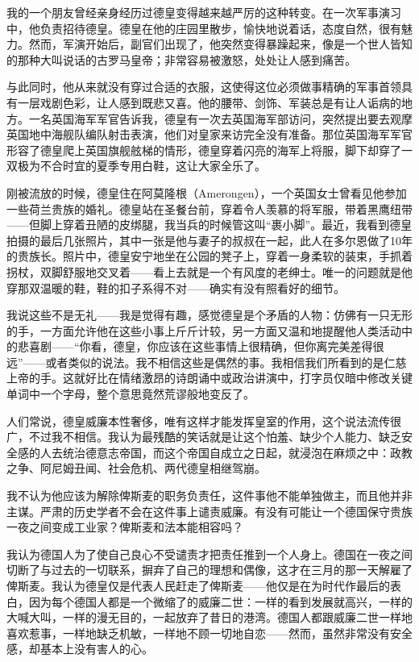 \documentclass[UTF8]{ctexart}
\begin{document}
我的一个朋友曾经亲身经历过德皇变得越来越严厉的这种转变。在一次军事演习中，他负责招待德皇。德皇在他的庄园里散步，愉快地说着话，态度自然，很有魅力。然而，军演开始后，副官们出现了，他突然变得暴躁起来，像是一个世人皆知的那种大叫说话的古罗马皇帝；非常容易被激怒，处处让人感到痛苦。

与此同时，他从来就没有穿过合适的衣服，这使得这位必须做事精确的军事首领具有一层戏剧色彩，让人感到既悲又喜。他的腰带、剑饰、军装总是有让人诟病的地方。一名英国海军军官告诉我，德皇有一次去英国海军部访问，突然提出要去观摩英国地中海舰队编队射击表演，他们对皇家来访完全没有准备。那位英国海军军官形容了德皇爬上英国旗舰舷梯的情形，德皇穿着闪亮的海军上将服，脚下却穿了一双极为不合时宜的夏季专用白鞋，这让大家全乐了。

刚被流放的时候，德皇住在阿莫隆根（Amerongen），一个英国女士曾看见他参加一些荷兰贵族的婚礼。德皇站在圣餐台前，穿着令人羡慕的将军服，带着黑鹰纽带——但脚上穿着丑陋的皮绑腿，我当兵的时候管这叫“裹小脚”。最近，我看到德皇拍摄的最后几张照片，其中一张是他与妻子的叔叔在一起，此人在多尔恩做了10年的贵族长。照片中，德皇安宁地坐在公园的凳子上，穿着一身柔软的装束，手抓着拐杖，双脚舒服地交叉着——看上去就是一个有风度的老绅士。唯一的问题就是他穿那双温暖的鞋，鞋的扣子系得不对——确实有没有照看好的细节。

我说这些不是无礼——我是觉得有趣，感觉德皇是个矛盾的人物：仿佛有一只无形的手，一方面允许他在这些小事上斤斤计较，另一方面又温和地提醒他人类活动中的悲喜剧——“你看，德皇，你应该在这些事情上很精确，但你离完美差得很远”——或者类似的说法。我不相信这些是偶然的事。我相信我们所看到的是仁慈上帝的手。这就好比在情绪激昂的诗朗诵中或政治讲演中，打字员仅暗中修改关键单词中一个字母，整个意思竟然荒谬般地变反了。

人们常说，德皇威廉本性奢侈，唯有这样才能发挥皇室的作用，这个说法流传很广，不过我不相信。我认为最残酷的笑话就是让这个怕羞、缺少个人能力、缺乏安全感的人去统治德意志帝国，而这个帝国自成立之日起，就浸泡在麻烦之中：政教之争、阿尼姆丑闻、社会危机、两代德皇相继驾崩。

我不认为他应该为解除俾斯麦的职务负责任，这件事他不能单独做主，而且他并非主谋。严肃的历史学者不会在这件事上谴责威廉。有没有可能让一个德国保守贵族一夜之间变成工业家？俾斯麦和法本能相容吗？

我认为德国人为了使自己良心不受谴责才把责任推到一个人身上。德国在一夜之间切断了与过去的一切联系，摒弃了自己的理想和偶像，这才在三月的那一天解雇了俾斯麦。我认为德皇仅是代表人民赶走了俾斯麦——他仅是在为时代作最后的表白，因为每个德国人都是一个微缩了的威廉二世：一样的看到发展就高兴，一样的大喊大叫，一样的漫无目的，一起放弃了昔日的港湾。德国人都跟威廉二世一样地喜欢惹事，一样地缺乏机敏，一样地不顾一切地自恋——然而，虽然非常没有安全感，却基本上没有害人的心。
\end{document}

